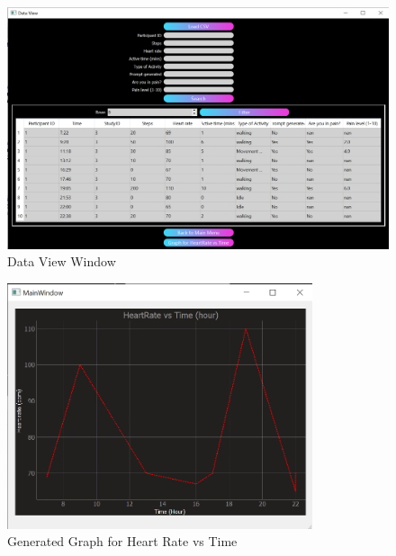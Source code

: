 \documentclass[12pt, titlepage]{article}
\begin{document}
\begin{figure}[h!]
	\begin{center}
		 \includegraphics[width=1\textwidth]{DataView}
		\caption{Data View Window}
		\label{DataView} 
	\end{center}
\end{figure}

\begin{figure}[h!]
	\begin{center}
		 \includegraphics[width=0.8\textwidth]{Graph}
		\caption{Generated Graph for Heart Rate vs Time}
		\label{Graph} 
	\end{center}
\end{figure}
\end{document}
